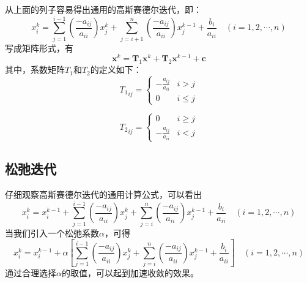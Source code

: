 从上面的列子容易得出通用的高斯赛德尔迭代，即：
\begin{equation}
  x_{i}^{k}
  =
  \sum_{j=1}^{i-1}
  \left(
    \frac{-a_{ij}}{a_{ii}}
  \right)
  x_{j}^{k}
  +
  \sum_{j=i+1}^{n}
  \left(
    \frac{-a_{ij}}{a_{ii}}
  \right)
  x_{j}^{k-1}
  +
  \frac{b_{i}}{a_{ii}}
  \quad
  (i=1,2,\cdots,n)
\end{equation}
写成矩阵形式，有
\begin{equation}
  \mathbf{x}^{k} 
  =
  \mathbf{T}_{1}\mathbf{x}^{k}
  +
  \mathbf{T}_{2}\mathbf{x}^{k-1}
  +
  \mathbf{c}
\end{equation}
其中，系数矩阵$T_{1}$和$T_{2}$的定义如下：
\begin{equation}
  {T_{1}}_{ij} 
  =
  \begin{cases}
    \displaystyle
    -\frac{a_{ij}}{a_{ii}} & i>j \\
    0 & i\le j
  \end{cases}
\end{equation}

\begin{equation}
  {T_{2}}_{ij} 
  =
  \begin{cases}
    0 & i\ge j
    \\
    \displaystyle
    -\frac{a_{ij}}{a_{ii}} & i<j 
  \end{cases}
\end{equation}

\subsection{松弛迭代}
仔细观察高斯赛德尔迭代的通用计算公式，可以看出
\begin{equation}
  x_{i}^{k}
  =
  x_{i}^{k-1}
  +
  \sum_{j=1}^{i-1}
  \left(
    \frac{-a_{ij}}{a_{ii}}
  \right)
  x_{j}^{k}
  +
  \sum_{j=i}^{n}
  \left(
    \frac{-a_{ij}}{a_{ii}}
  \right)
  x_{j}^{k-1}
  +
  \frac{b_{i}}{a_{ii}}
  \quad
  (i=1,2,\cdots,n)
\end{equation}
当我们引入一个松弛系数$\alpha$，可得
\begin{equation}
  x_{i}^{k}
  =
  x_{i}^{k-1}
  +
  \alpha
  \left[
  \sum_{j=1}^{i-1}
  \left(
    \frac{-a_{ij}}{a_{ii}}
  \right)
  x_{j}^{k}
  +
  \sum_{j=i}^{n}
  \left(
    \frac{-a_{ij}}{a_{ii}}
  \right)
  x_{j}^{k-1}
  +
  \frac{b_{i}}{a_{ii}}
    \right]
  \quad
  (i=1,2,\cdots,n)
\end{equation}
通过合理选择$\alpha$的取值，可以起到加速收敛的效果。
